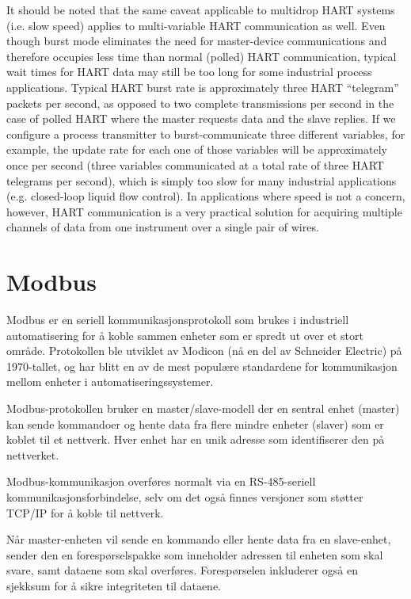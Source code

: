 It should be noted that the same caveat applicable to multidrop HART systems (i.e. slow speed) applies to multi-variable HART communication as well.  Even though burst mode eliminates the need for master-device communications and therefore occupies less time than normal (polled) HART communication, typical wait times for HART data may still be too long for some industrial process applications.  Typical HART burst rate is approximately three HART ``telegram'' packets per second, as opposed to two complete transmissions per second in the case of polled HART where the master requests data and the slave replies.  If we configure a process transmitter to burst-communicate three different variables, for example, the update rate for each one of those variables will be approximately once per second (three variables communicated at a total rate of three HART telegrams per second), which is simply too slow for many industrial applications (e.g. closed-loop liquid flow control).  In applications where speed is not a concern, however, HART communication is a very practical solution for acquiring multiple channels of data from one instrument over a single pair of wires.








\filbreak
\section{Modbus}

Modbus er en seriell kommunikasjonsprotokoll som brukes i industriell automatisering for å koble sammen enheter som er spredt ut over et stort område. Protokollen ble utviklet av Modicon (nå en del av Schneider Electric) på 1970-tallet, og har blitt en av de mest populære standardene for kommunikasjon mellom enheter i automatiseringssystemer.

Modbus-protokollen bruker en master/slave-modell der en sentral enhet (master) kan sende kommandoer og hente data fra flere mindre enheter (slaver) som er koblet til et nettverk. Hver enhet har en unik adresse som identifiserer den på nettverket.

Modbus-kommunikasjon overføres normalt via en RS-485-seriell kommunikasjonsforbindelse, selv om det også finnes versjoner som støtter TCP/IP for å koble til nettverk.

Når master-enheten vil sende en kommando eller hente data fra en slave-enhet, sender den en forespørselspakke som inneholder adressen til enheten som skal svare, samt dataene som skal overføres. Forespørselen inkluderer også en sjekksum for å sikre integriteten til dataene.

